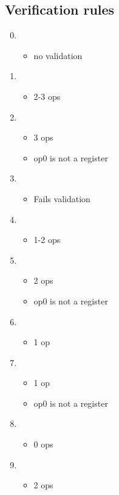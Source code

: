 \documentclass[12pt]{article}
\begin{document}
\subsection{Verification rules}
\begin{enumerate}
\setcounter{enumi}{-1}
\item \begin{itemize} \item no validation \end{itemize}    
\item \begin{itemize} \item 2-3 ops \end{itemize}        
\item \begin{itemize}
    \item 3 ops
    \item op0 is not a register        
    \end{itemize}
\item \begin {itemize} \item Fails validation \end{itemize}  
\item \begin {itemize} \item 1-2 ops \end{itemize}
\item \begin {itemize}
     \item 2 ops
     \item op0 is not a register
     \end{itemize}
\item \begin{itemize} \item 1 op \end{itemize}
\item \begin{itemize}
        \item 1 op
        \item op0 is not a register
      \end{itemize}
\item \begin {itemize} \item 0 ops \end{itemize}
\item \begin {itemize} \item 2 ops \end{itemize}
\end{enumerate}
\end{document}
